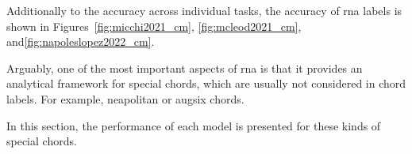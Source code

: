 
Additionally to the accuracy across individual tasks, the
accuracy of \gls{rna} labels is shown in
Figures~\ref{fig:micchi2021_cm}, \ref{fig:mcleod2021_cm},
and\ref{fig:napoleslopez2022_cm}.


Arguably, one of the most important aspects of \gls{rna} is
that it provides an analytical framework for special chords,
which are usually not considered in chord labels. For
example, \gls{neapolitan} or \gls{augsix} chords.

In this section, the performance of each model is presented
for these kinds of special chords.
